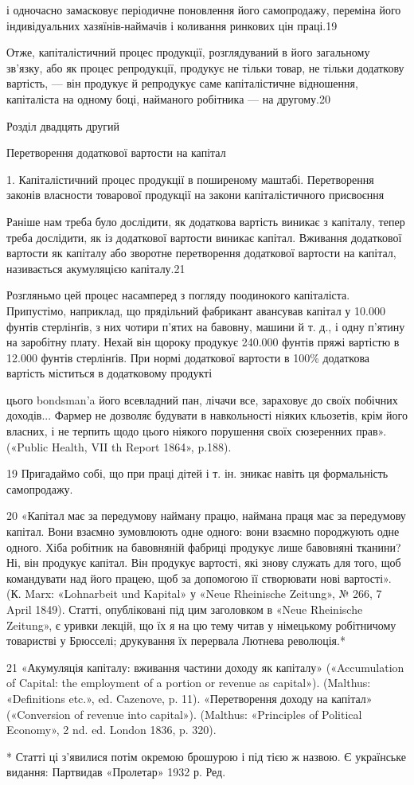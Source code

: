 і одночасно замасковує періодичне поновлення його самопродажу,
переміна його індивідуальних хазяїнів-наймачів і коливання
ринкових цін праці.19

Отже, капіталістичний процес продукції, розглядуваний в
його загальному зв’язку, або як процес репродукції, продукує
не тільки товар, не тільки додаткову вартість, — він продукує
й репродукує саме капіталістичне відношення, капіталіста на
одному боці, найманого робітника — на другому.20

Розділ двадцять другий

Перетворення додаткової вартости на капітал

1. Капіталістичний процес продукції в поширеному маштабі.
Перетворення законів власности товарової продукції на закони
капіталістичного присвоєння

Раніше нам треба було дослідити, як додаткова вартість виникає
з капіталу, тепер треба дослідити, як із додаткової вартости
виникає капітал. Вживання додаткової вартости як капіталу
або зворотне перетворення додаткової вартости на капітал, називається
акумуляцією капіталу.21

Розгляньмо цей процес насамперед з погляду поодинокого капіталіста. Припустімо, наприклад, що
прядільний фабрикант авансував капітал у 10.000 фунтів стерлінґів, з них чотири п’ятих на бавовну,
машини й т. д., і одну п’ятину на заробітну плату. Нехай він щороку продукує 240.000 фунтів пряжі
вартістю в 12.000 фунтів стерлінґів. При нормі додаткової вартости в 100\% додаткова вартість
міститься в додатковому продукті

цього bondsman’a його всевладний пан, лічачи все, зараховує до своїх побічних доходів... Фармер не
дозволяє будувати в навкольності ніяких кльозетів, крім його власних, і не терпить щодо цього
ніякого порушення своїх сюзеренних прав». («Public Health, VII th Report 1864», p.188).

19 Пригадаймо собі, що при праці дітей і т. ін. зникає навіть ця формальність
самопродажу.

20 «Капітал має за передумову найману працю, наймана праця має за передумову капітал. Вони взаємно
зумовлюють одне одного: вони взаємно породжують одне одного. Хіба робітник на бавовняній фабриці
продукує лише бавовняні тканини? Ні, він продукує капітал. Він продукує вартості, які знову служать
для того, щоб командувати над його працею, щоб за допомогою її створювати нові вартості». (К. Marx:
«Lohnarbeit und Kapital» у «Neue Rheinische Zeitung», № 266, 7 April 1849). Статті, опубліковані під
цим заголовком в «Neue Rheinische Zeitung», є уривки лекцій, що їх я на цю тему читав у німецькому
робітничому товаристві у Брюсселі; друкування їх перервала Лютнева
революція.*

21 «Акумуляція капіталу: вживання частини доходу як капіталу» («Accumulation of Capital: the
employment of a portion or revenue as capital»). (Malthus: «Definitions etc.», ed. Cazenove, p. 11).
«Перетворення доходу на капітал» («Conversion of revenue into capital»).
(Malthus: «Principles of Political Economy», 2 nd. ed. London 1836, p. 320).

* Статті ці з’явилися потім окремою брошурою і під тією ж назвою.
Є українське видання: Партвидав «Пролетар» 1932 р. Ред.

